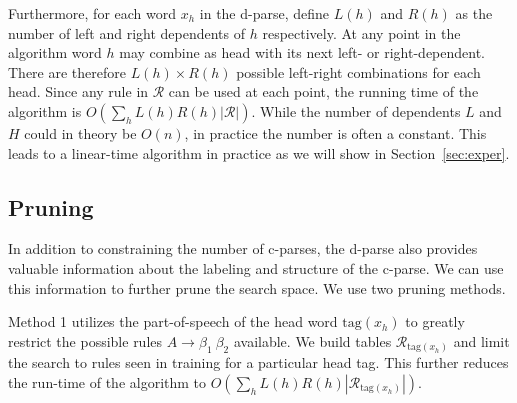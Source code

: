 \documentclass[11pt,letterpaper]{article}
\newcommand{\rules}{\mathcal{R}}
\newcommand{\Rule}[3]{#1 \rightarrow #2\ #3}
\newcommand{\TagFN}[1]{\mathrm{tag}({#1})}
\newcommand{\nascomment}[1]{\textcolor{blue}{\bf \small [#1 --nas]}}
\begin{document}
Furthermore, for each word $x_h$ in the d-parse, define $L(h)$ and $R(h)$ as the
number of left and right dependents of $h$ respectively. At any point
in the algorithm word $h$ may combine as head with its next left- or
right-dependent.  There are therefore $L(h) \times R(h)$ possible
 left-right combinations for each head. Since any rule in
$\rules$ can be used at each point, the running time of the algorithm
is $O(\sum_{h} L(h)R(h)|\rules|)$.  While the number of
dependents $L$ and $H$ could in theory be $O(n)$, in practice the
number is often a constant. This leads to a linear-time algorithm
in practice as we will show in Section~\ref{sec:exper}.





\subsection{Pruning}
\label{sec:prune}

In addition to constraining the number of c-parses, 
the d-parse also provides valuable information about the labeling 
and structure of the c-parse. We can use this information to 
further prune the search space. We use two pruning methods.

Method 1 utilizes the part-of-speech of the head word $\TagFN{x_h}$ to
greatly restrict the possible rules $\Rule{A}{\beta_1}{\beta_2}$
available.  We build tables $\rules_{\TagFN{x_h}}$ and limit the
search to rules seen in training for a particular head tag. This
further reduces the run-time of the algorithm to $O(\sum_{h} L(h) R(h)
|\rules_{\TagFN{x_h}}|)$.
\end{document}
